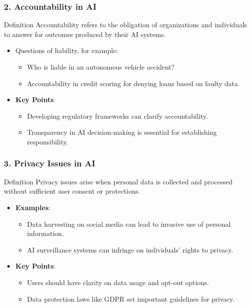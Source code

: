\documentclass[aspectratio=169]{beamer}
\begin{document}
\begin{frame}[fragile]
    \frametitle{2. Accountability in AI}
    \begin{block}{Definition}
        Accountability refers to the obligation of organizations and individuals to answer for outcomes produced by their AI systems.
    \end{block}
    \begin{itemize}
        \item Questions of liability, for example:
        \begin{itemize}
            \item Who is liable in an autonomous vehicle accident?
            \item Accountability in credit scoring for denying loans based on faulty data.
        \end{itemize}
        \item \textbf{Key Points}:
        \begin{itemize}
            \item Developing regulatory frameworks can clarify accountability.
            \item Transparency in AI decision-making is essential for establishing responsibility.
        \end{itemize}
    \end{itemize}
\end{frame}

\begin{frame}[fragile]
    \frametitle{3. Privacy Issues in AI}
    \begin{block}{Definition}
        Privacy issues arise when personal data is collected and processed without sufficient user consent or protections.
    \end{block}
    \begin{itemize}
        \item \textbf{Examples}:
        \begin{itemize}
            \item Data harvesting on social media can lead to invasive use of personal information.
            \item AI surveillance systems can infringe on individuals' rights to privacy.
        \end{itemize}
        \item \textbf{Key Points}:
        \begin{itemize}
            \item Users should have clarity on data usage and opt-out options.
            \item Data protection laws like GDPR set important guidelines for privacy.
        \end{itemize}
    \end{itemize}
\end{frame}
\end{document}

